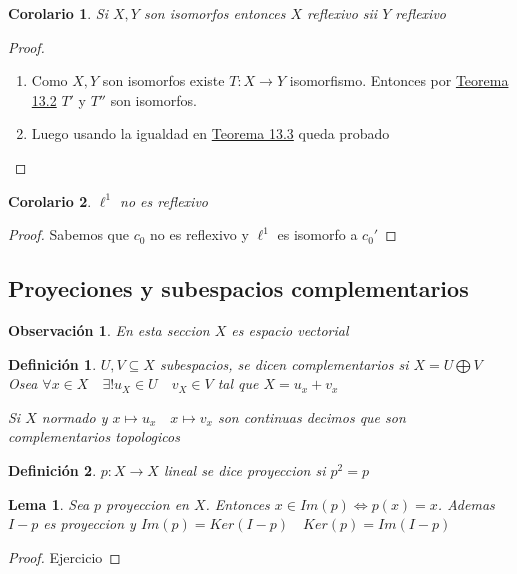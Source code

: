 \documentclass[10pt]{extarticle}
\theoremstyle{break}
\newtheorem{corollary}{Corolario}[theorem]
\newtheorem{lemma}[theorem]{Lema}
\newtheorem*{remark}{Observación}
\newtheorem{definition}{Definición}[section]
\theoremstyle{definition}
\begin{document}
\begin{corollary} \label{13.3}
	Si $X,Y$ son isomorfos entonces $X$ reflexivo sii $Y$ reflexivo 
\end{corollary}
\begin{proof}
	\begin{enumerate}	
		\item Como $X,Y$ son isomorfos existe $T:X\longrightarrow Y $ isomorfismo. Entonces por \hyperref[13.2]{Teorema 13.2}  $T'$ y $T''$ son isomorfos. 
		\item Luego usando la igualdad en \hyperref[13.3]{Teorema 13.3} queda probado
	\end{enumerate}
\end{proof}

\begin{corollary}
	$\ell^{1} $ no es reflexivo
\end{corollary}
\begin{proof}
	Sabemos que $c_{0}$ no es reflexivo y $\ell^{1} $ es isomorfo a $c_{0}'$ 
\end{proof}

\subsection{Proyeciones y subespacios complementarios}
\begin{remark}
	En esta seccion $X$ es espacio vectorial 
\end{remark}

\begin{definition}
	$U,V \subseteq X$ subespacios, se dicen complementarios si $X=U\bigoplus V$
	Osea $\forall x\in X \quad \exists !u_{X}\in U\quad v_{X}\in V$ tal que $X=u_{x}+v_{x}$ 

	Si $X$ normado y $x\mapsto u_{x}\quad x\mapsto v_{x}$ son continuas decimos que son complementarios topologicos 
\end{definition}

\begin{definition}
	$p:X\longrightarrow X $ lineal se dice proyeccion si $p^{2}=p $ 
\end{definition}

\begin{lemma}
	Sea $p$ proyeccion en $X$. Entonces $x\in Im(p)\iff p(x)=x$. Ademas $I-p$ es proyeccion y $Im(p)=Ker(I-p)\quad Ker(p)=Im(I-p)$   
\end{lemma}
\begin{proof}
	Ejercicio
\end{proof}
\end{document}
